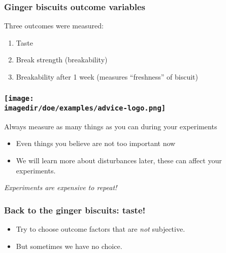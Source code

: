 \documentclass[handout,11pt,aspectratio=169,mathserif]{beamer}
\begin{document}
\begin{frame}\frametitle{Ginger biscuits outcome variables}
	Three outcomes were measured:
	\begin{enumerate}
		\item	Taste		
		\item	Break strength (breakability)
		\item	Breakability after 1 week (measures ``freshness'' of biscuit)
	\end{enumerate}
\end{frame}

\begin{frame}\frametitle{\texttt{[image: \\imagedir/doe/examples/advice-logo.png]}}
	\begin{exampleblock}{Always measure as many things as you can during your experiments}
		\begin{itemize}
			\item	Even things you believe are not too important now
			\item	We will learn more about disturbances later, these can affect your experiments.
		\end{itemize}
	\end{exampleblock}
	\vspace{24pt}\pause
	{\color{myOrange} 	\emph{Experiments are expensive to repeat!}}
\end{frame}

\begin{frame}\frametitle{Back to the ginger biscuits: taste!}
	\begin{itemize}
		\item	Try to choose outcome factors that are \emph{not} subjective.
		\item	But sometimes we have no choice.
	\end{itemize}
\end{frame}
\end{document}
